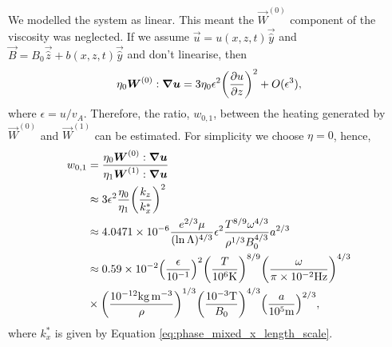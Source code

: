 We modelled the system as linear. This meant the $\vec{W}^{(0)}$ component of the viscosity was neglected. If we assume $\vec{u}=u(x,z,t)\vec{\hat{y}}$ and $\vec{B}=B_0\vec{\hat{z}} + b(x,z,t)\vec{\hat{y}}$ and don't linearise, then
\begin{equation}
    \eta_0\boldsymbol{W}^{(0)}:\grad{\boldsymbol{u}} = 3\eta_0\epsilon^2\qty(\pdv{u}{z})^2 + O(\epsilon^3),
\end{equation}
where $\epsilon=u/v_A$.
Therefore, the ratio, $w_{0,1}$, between the heating generated by $\vec{W}^{(0)}$ and $\vec{W}^{(1)}$ can be estimated. For simplicity we choose $\eta=0$, hence,
\begin{equation}
\label{eq:w01}
\begin{aligned}
    w_{0,1} &= \frac{\eta_0\vec{W}^{(0)}:\grad{\vec{u}}}{\eta_1\vec{W}^{(1)}:\grad{\vec{u}}} \\
    &\approx 3\epsilon^2\frac{\eta_0}{\eta_1}\qty(\frac{k_z}{k_x^*})^2 \\
    &\approx 4.0471\times10^{-6}\frac{e^{2/3}\mu}{(\ln\Lambda)^{4/3}}\epsilon^2\frac{T^{8/9}\omega^{4/3}}{\rho^{1/3}B_0^{4/3}}a^{2/3} \\
    &\approx 0.59\times10^{-2}\qty(\frac{\epsilon}{10^{-1}})^2\qty(\frac{T}{10^{6}\si{.K}})^{8/9}\qty(\frac{\omega}{\pi\times10^{-2}\si{.Hz}})^{4/3}\\
    &\times\qty(\frac{10^{-12}\si{.kg.m^{-3}}}{\rho})^{1/3}\qty(\frac{10^{-3}\si{.T}}{B_0})^{4/3}\qty(\frac{a}{10^5\si{.m}})^{2/3},
\end{aligned}
\end{equation}
where $k_x^*$ is given by Equation \eqref{eq:phase_mixed_x_length_scale}.

